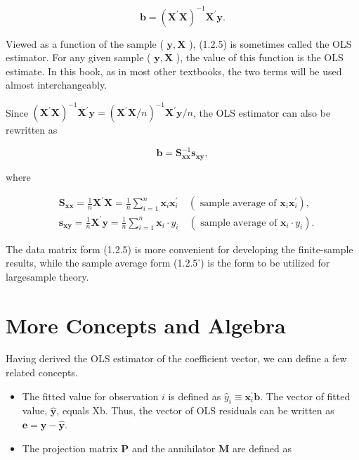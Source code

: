 \documentclass[10pt]{article}
\begin{document}
\begin{equation*}
\mathbf{b}=\left(\mathbf{X}^{\prime} \mathbf{X}\right)^{-1} \mathbf{X}^{\prime} \mathbf{y} . \tag{1.2.5}
\end{equation*}


Viewed as a function of the sample ( $\mathbf{y}, \mathbf{X}$ ), (1.2.5) is sometimes called the OLS estimator. For any given sample ( $\mathbf{y}, \mathbf{X}$ ), the value of this function is the OLS estimate. In this book, as in most other textbooks, the two terms will be used almost interchangeably.

Since $\left(\mathbf{X}^{\prime} \mathbf{X}\right)^{-1} \mathbf{X}^{\prime} \mathbf{y}=\left(\mathbf{X}^{\prime} \mathbf{X} / n\right)^{-1} \mathbf{X}^{\prime} \mathbf{y} / n$, the OLS estimator can also be rewritten as


\begin{equation*}
\mathbf{b}=\mathbf{S}_{\mathbf{x x}}^{-1} \mathbf{s}_{\mathbf{x y}}, \tag{1.2.5́}
\end{equation*}


where


\begin{align*}
& \mathbf{S}_{\mathbf{x} \mathbf{x}}=\frac{1}{n} \mathbf{X}^{\prime} \mathbf{X}=\frac{1}{n} \sum_{i=1}^{n} \mathbf{x}_{i} \mathbf{x}_{i}^{\prime} \quad\left(\text { sample average of } \mathbf{x}_{i} \mathbf{x}_{i}^{\prime}\right),  \tag{1.2.6a}\\
& \mathbf{s}_{\mathbf{x y}}=\frac{1}{n} \mathbf{X}^{\prime} \mathbf{y}=\frac{1}{n} \sum_{i=1}^{n} \mathbf{x}_{i} \cdot y_{i} \quad\left(\text { sample average of } \mathbf{x}_{i} \cdot y_{i}\right) . \tag{1.2.6b}
\end{align*}


The data matrix form (1.2.5) is more convenient for developing the finite-sample results, while the sample average form (1.2.5') is the form to be utilized for largesample theory.

\section*{More Concepts and Algebra}
Having derived the OLS estimator of the coefficient vector, we can define a few related concepts.

\begin{itemize}
  \item The fitted value for observation $i$ is defined as $\hat{y}_{i} \equiv \mathbf{x}_{i}^{\prime} \mathbf{b}$. The vector of fitted value, $\hat{\mathbf{y}}$, equals Xb. Thus, the vector of OLS residuals can be written as $\mathbf{e}= \mathbf{y}-\hat{\mathbf{y}}$.
  \item The projection matrix $\mathbf{P}$ and the annihilator $\mathbf{M}$ are defined as
\end{itemize}
\end{document}

